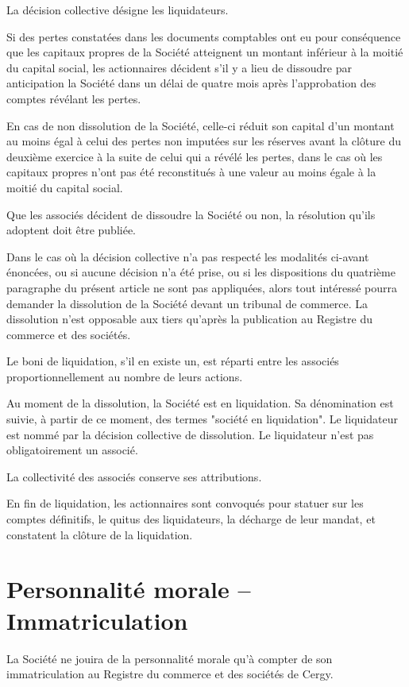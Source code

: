 \documentclass[a4paper,12pt]{report}
\begin{document}
La décision collective désigne les liquidateurs.

Si des pertes constatées dans les documents comptables ont eu pour conséquence que les capitaux propres de la Société atteignent un montant inférieur à la moitié du capital social, les actionnaires décident s'il y a lieu de dissoudre par anticipation la Société dans un délai de quatre mois après l'approbation des comptes révélant les pertes.

En cas de non dissolution de la Société, celle-ci réduit son capital d'un montant au moins égal à celui des pertes non imputées sur les réserves avant la clôture du deuxième exercice à la suite de celui qui a révélé les pertes, dans le cas où les capitaux propres n'ont pas été reconstitués à une valeur au moins égale à la moitié du capital social.

Que les associés décident de dissoudre la Société ou non, la résolution qu'ils adoptent doit être publiée.

Dans le cas où la décision collective n'a pas respecté les modalités ci-avant énoncées, ou si aucune décision n'a été prise, ou si les dispositions du quatrième paragraphe du présent article ne sont pas appliquées, alors tout intéressé pourra demander la dissolution de la Société devant un tribunal de commerce. La dissolution n'est opposable aux tiers qu'après la publication au Registre du commerce et des sociétés.

Le boni de liquidation, s'il en existe un, est réparti entre les associés proportionnellement au nombre de leurs actions.

Au moment de la dissolution, la Société est en liquidation. Sa dénomination est suivie, à partir de ce moment, des termes "société en liquidation". Le liquidateur est nommé par la décision collective de dissolution. Le liquidateur n'est pas obligatoirement un associé.

La collectivité des associés conserve ses attributions.

En fin de liquidation, les actionnaires sont convoqués pour statuer sur les comptes définitifs, le quitus des liquidateurs, la décharge de leur mandat, et constatent la clôture de la liquidation.

\section{Personnalité morale -- Immatriculation}
La Société ne jouira de la personnalité morale qu'à compter de son immatriculation au Registre du commerce et des sociétés de Cergy.
\end{document}
